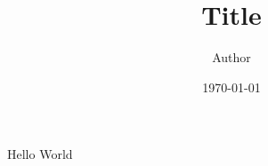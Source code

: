 \documentclass[10pt]{article}
\begin{document}
 

\author{Author}

\title{Title}

\date{\today}

\maketitle



\titlepage

Hello World
\end{document}

